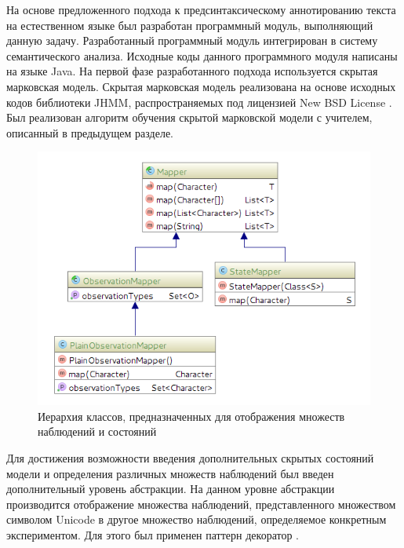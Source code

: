 На основе предложенного подхода к предсинтаксическому аннотированию текста на естественном языке был разработан программный модуль, выполняющий данную задачу. Разработанный программный модуль интегрирован в систему семантического анализа. Исходные коды данного программного модуля написаны на языке Java. На первой фазе разработанного подхода используется скрытая марковская модель. Скрытая марковская модель реализована на основе исходных кодов библиотеки JHMM, распространяемых под лицензией New BSD License \cite{nbsd}. Был реализован алгоритм обучения скрытой марковской модели с учителем, описанный в предыдущем разделе. 
\begin{figure}[H]
	\centering
	\includegraphics[scale=0.8]{img/uml_mappers.png}
	\caption{Иерархия классов, предназначенных для отображения множеств наблюдений и состояний}
\end{figure}
Для достижения возможности введения дополнительных скрытых состояний модели и определения различных множеств наблюдений был введен дополнительный уровень абстракции. На данном уровне абстракции производится отображение множества наблюдений, представленного множеством символом Unicode в другое множество наблюдений, определяемое конкретным экспериментом. 
Для этого был применен паттерн декоратор \cite{gof}.

